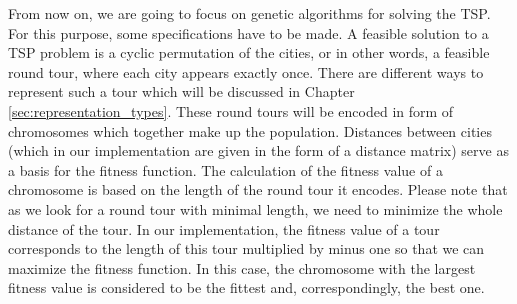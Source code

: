 From now on, we are going to focus on genetic algorithms for solving the TSP. For this purpose, some specifications have to be made. A feasible solution to a TSP problem is a cyclic permutation of the cities, or in other words, a feasible round tour, where each city appears exactly once. There are different ways to represent such a tour which will be discussed in Chapter \ref{sec:representation_types}. These round tours will be encoded in form of chromosomes which together make up the population. Distances between cities (which in our implementation are given in the form of a distance matrix) serve as a basis for the fitness function. The calculation of the fitness value of a chromosome is based on the length of the round tour it encodes. Please note that as we look for a round tour with minimal length, we need to minimize the whole distance of the tour. In our implementation, the fitness value of a tour corresponds to the length of this tour multiplied by minus one so that we can maximize the fitness function. In this case, the chromosome with the largest fitness value is considered to be the fittest and, correspondingly, the best one. \par